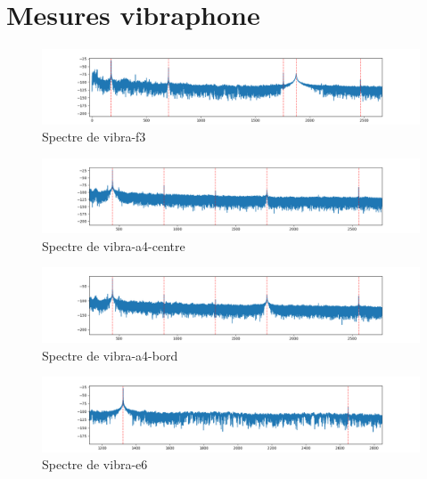 \documentclass[atiam, article]{rapport} %
\begin{document}
\section{Mesures vibraphone}
\label{annexe:vibra}
\begin{figure}[h!]
  \begin{center}
      \includegraphics[width=\textwidth]{percu/vibra-f3.wav.spectre.png}
  \end{center}
  \caption{Spectre de vibra-f3}
\end{figure}
\begin{figure}[h!]
  \begin{center}
      \includegraphics[width=\textwidth]{percu/vibra-a4-centre.wav.spectre.png}
  \end{center}
  \caption{Spectre de vibra-a4-centre}
\end{figure}
\begin{figure}[h!]
  \begin{center}
      \includegraphics[width=\textwidth]{percu/vibra-a4-bord.wav.spectre.png}
  \end{center}
  \caption{Spectre de vibra-a4-bord}
\end{figure}
\begin{figure}[h!]
  \begin{center}
      \includegraphics[width=\textwidth]{percu/vibra-e6.wav.spectre.png}
  \end{center}
  \caption{Spectre de vibra-e6}
\end{figure}




\end{document}
